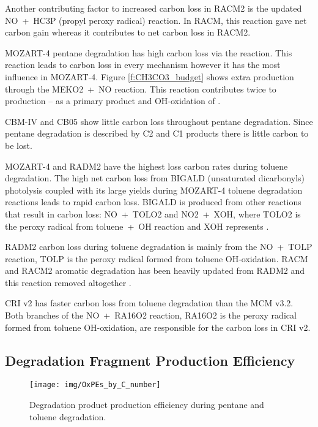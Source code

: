 Another contributing factor to increased carbon loss in RACM2 is the updated \mbox{NO + HC3P} (propyl peroxy radical) reaction.
In RACM, this reaction gave net carbon gain whereas it contributes to net carbon loss in RACM2.

MOZART-4 pentane degradation has high carbon loss via the  reaction.
This reaction leads to carbon loss in every mechanism however it has the most influence in MOZART-4. 
Figure \ref{f:CH3CO3_budget} shows extra  production through the \mbox{MEKO2 + NO} reaction.
This reaction contributes twice to  production -- as a primary product and OH-oxidation of .

CBM-IV and CB05 show little carbon loss throughout pentane degradation.
Since pentane degradation is described by C2 and C1 products there is little carbon to be lost.

MOZART-4 and RADM2 have the highest loss carbon rates during toluene degradation.
The high net carbon loss from BIGALD (unsaturated dicarbonyls) photolysis coupled with its large yields during MOZART-4 toluene degradation reactions leads to rapid carbon loss.
BIGALD is produced from other reactions that result in carbon loss: \mbox{NO + TOLO2} and \mbox{NO2 + XOH}, where TOLO2 is the peroxy radical from \mbox{toluene + OH} reaction and XOH represents  \citep{Emmons:2010}.

RADM2 carbon loss during toluene degradation is mainly from the \mbox{NO + TOLP} reaction, TOLP is the peroxy radical formed from toluene OH-oxidation.
RACM and RACM2 aromatic degradation has been heavily updated from RADM2 and this reaction removed altogether \citep{Stockwell:1997, Goliff:2013}.

CRI v2 has faster carbon loss from toluene degradation than the MCM v3.2.
Both branches of the \mbox{NO + RA16O2} reaction, RA16O2 is the peroxy radical formed from toluene OH-oxidation, are responsible for the carbon loss in CRI v2.

\subsection[Degradation Fragment Ox Production Efficiency]{Degradation Fragment  Production Efficiency} \label{ss:OxPE}

\begin{figure}
    \centering
    \texttt{[image: img/OxPEs\_by\_C\_number]}
    \vspace{0mm}
    \caption{Degradation product  production efficiency during pentane and toluene degradation.}
    \vspace{-4mm}
    \label{f:OxPE}
\end{figure}

